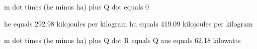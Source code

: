 m dot times (he minus ha) plus Q dot equals 0

he equals 292.98 kilojoules per kilogram
hu equals 419.09 kilojoules per kilogram

m dot times (he minus ha) plus Q dot R equals Q aus equals 62.18 kilowatts